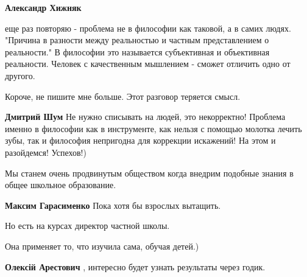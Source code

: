 \begin{itemize}
\begin{itemize}
\textbf{Александр Хижняк} 

еще раз повторяю - проблема не в философии как
таковой, а в самих людях. "Причина в разности между реальностью и частным
представлением о реальности." В философии это называется субъективная и
объективная реальности. Человек с качественным мышлением - сможет отличить одно
от другого.

Короче, не пишите мне больше. Этот разговор теряется смысл.

 
\textbf{Дмитрий Шум} Не нужно списывать на людей, это некорректно! Проблема
именно в философии как в инструменте, как нельзя с помощью молотка лечить зубы,
так и философия непригодна для коррекции искажений! На этом и разойдемся!
Успехов!)

\end{itemize}

 
Мы станем очень продвинутым обществом когда внедрим подобные знания в общее
школьное образование.

\begin{itemize}
 
\textbf{Максим Гарасименко}
Пока хотя бы взрослых вытащить.

Но есть на курсах директор частной школы.

Она применяет то, что изучила сама, обучая детей.)

 
\textbf{Олексій Арестович} , интересно будет узнать результаты через годик.



\end{itemize}
\end{itemize}
